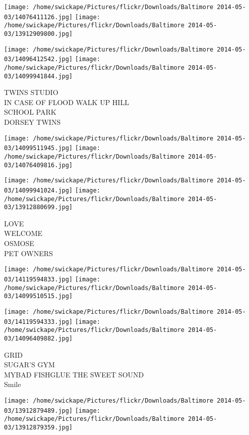 \documentclass[10pt,letterpaper]{article}
\begin{document}
\texttt{[image: /home/swickape/Pictures/flickr/Downloads/Baltimore 2014-05-03/14076411126.jpg]}
\texttt{[image: /home/swickape/Pictures/flickr/Downloads/Baltimore 2014-05-03/13912909800.jpg]}

\texttt{[image: /home/swickape/Pictures/flickr/Downloads/Baltimore 2014-05-03/14096412542.jpg]}
\texttt{[image: /home/swickape/Pictures/flickr/Downloads/Baltimore 2014-05-03/14099941844.jpg]}

TWINS STUDIO\\
IN CASE OF FLOOD WALK UP HILL\\
SCHOOL PARK\\
DORSEY TWINS\\
\pagebreak

\texttt{[image: /home/swickape/Pictures/flickr/Downloads/Baltimore 2014-05-03/14099511945.jpg]}
\texttt{[image: /home/swickape/Pictures/flickr/Downloads/Baltimore 2014-05-03/14076409816.jpg]}

\texttt{[image: /home/swickape/Pictures/flickr/Downloads/Baltimore 2014-05-03/14099941024.jpg]}
\texttt{[image: /home/swickape/Pictures/flickr/Downloads/Baltimore 2014-05-03/13912880699.jpg]}

LOVE\\
WELCOME\\
OSMOSE\\
PET OWNERS\\
\pagebreak

\texttt{[image: /home/swickape/Pictures/flickr/Downloads/Baltimore 2014-05-03/14119594833.jpg]}
\texttt{[image: /home/swickape/Pictures/flickr/Downloads/Baltimore 2014-05-03/14099510515.jpg]}

\texttt{[image: /home/swickape/Pictures/flickr/Downloads/Baltimore 2014-05-03/14119594333.jpg]}
\texttt{[image: /home/swickape/Pictures/flickr/Downloads/Baltimore 2014-05-03/14096409882.jpg]}

GRID\\
SUGAR'S GYM\\
MYBAD FISHGLUE THE SWEET SOUND\\
Smile\\
\pagebreak

\texttt{[image: /home/swickape/Pictures/flickr/Downloads/Baltimore 2014-05-03/13912879489.jpg]}
\texttt{[image: /home/swickape/Pictures/flickr/Downloads/Baltimore 2014-05-03/13912879359.jpg]}
\end{document}
